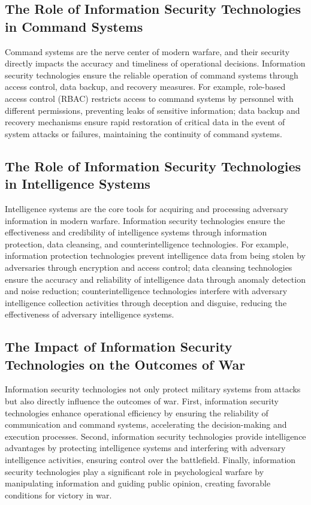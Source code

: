 \documentclass[12pt, a4paper]{article}
\begin{document}
\subsection{The Role of Information Security Technologies in Command Systems}

Command systems are the nerve center of modern warfare, and their security directly impacts the accuracy and timeliness of operational decisions. Information security technologies ensure the reliable operation of command systems through access control, data backup, and recovery measures. For example, role-based access control (RBAC) restricts access to command systems by personnel with different permissions, preventing leaks of sensitive information; data backup and recovery mechanisms ensure rapid restoration of critical data in the event of system attacks or failures, maintaining the continuity of command systems.

\subsection{The Role of Information Security Technologies in Intelligence Systems}

Intelligence systems are the core tools for acquiring and processing adversary information in modern warfare. Information security technologies ensure the effectiveness and credibility of intelligence systems through information protection, data cleansing, and counterintelligence technologies. For example, information protection technologies prevent intelligence data from being stolen by adversaries through encryption and access control; data cleansing technologies ensure the accuracy and reliability of intelligence data through anomaly detection and noise reduction; counterintelligence technologies interfere with adversary intelligence collection activities through deception and disguise, reducing the effectiveness of adversary intelligence systems.

\subsection{The Impact of Information Security Technologies on the Outcomes of War}

Information security technologies not only protect military systems from attacks but also directly influence the outcomes of war. First, information security technologies enhance operational efficiency by ensuring the reliability of communication and command systems, accelerating the decision-making and execution processes. Second, information security technologies provide intelligence advantages by protecting intelligence systems and interfering with adversary intelligence activities, ensuring control over the battlefield. Finally, information security technologies play a significant role in psychological warfare by manipulating information and guiding public opinion, creating favorable conditions for victory in war.
\end{document}
